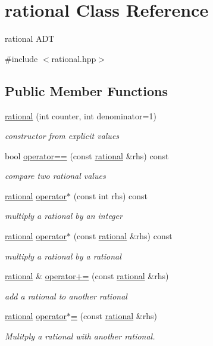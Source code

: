 \hypertarget{classrational}{}\section{rational Class Reference}
\label{classrational}


rational A\+DT  




{\ttfamily \#include $<$rational.\+hpp$>$}

\subsection*{Public Member Functions}
\begin{DoxyCompactItemize}
\item 
\hyperlink{classrational_a5f971ef33181044f54d8e4fee71cb957}{rational} (int counter, int denominator=1)
\begin{DoxyCompactList}\small\item\em constructor from explicit values \end{DoxyCompactList}\item 
bool \hyperlink{classrational_a5f9a93cc7fd6309f5eae4c76d81f28d5}{operator==} (const \hyperlink{classrational}{rational} \&rhs) const 
\begin{DoxyCompactList}\small\item\em compare two rational values \end{DoxyCompactList}\item 
\hyperlink{classrational}{rational} \hyperlink{classrational_acbaf4f76b2caf4aafb850202e29d69ce}{operator$\ast$} (const int rhs) const 
\begin{DoxyCompactList}\small\item\em multiply a rational by an integer \end{DoxyCompactList}\item 
\hyperlink{classrational}{rational} \hyperlink{classrational_a13f267e5cdafffcc44203762548bb5cd}{operator$\ast$} (const \hyperlink{classrational}{rational} \&rhs) const 
\begin{DoxyCompactList}\small\item\em multiply a rational by a rational \end{DoxyCompactList}\item 
\hyperlink{classrational}{rational} \& \hyperlink{classrational_a9b83ad0c803d2ac242b42e71d954a356}{operator+=} (const \hyperlink{classrational}{rational} \&rhs)
\begin{DoxyCompactList}\small\item\em add a rational to another rational \end{DoxyCompactList}\item 
\hyperlink{classrational}{rational} \hyperlink{classrational_a2b5729aef261d16cd18ff7c7fcbf8c6e}{operator$\ast$=} (const \hyperlink{classrational}{rational} \&rhs)
\begin{DoxyCompactList}\small\item\em Mulitply a rational with another rational. \end{DoxyCompactList}\end{DoxyCompactItemize}
